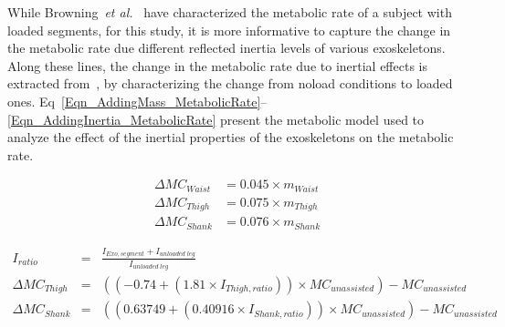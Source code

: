 \documentclass[10pt,letterpaper]{article}
\newcommand{\etal}{\textit{et al.}}
\begin{document}




While Browning~\etal~\cite{Browning2007} have characterized the metabolic rate of a subject with loaded segments, for this study, it is more informative to capture the change in the metabolic rate due different reflected inertia levels of various exoskeletons. Along these lines, the change in the metabolic rate due to inertial effects is extracted from~\cite{Browning2007}, by characterizing the change from noload conditions to loaded ones.  Eq~\eqref{Eqn_AddingMass_MetabolicRate}--\eqref{Eqn_AddingInertia_MetabolicRate} present the metabolic model used to analyze the effect of the inertial properties of the exoskeletons on the metabolic rate.

\begin{equation}\label{Eqn_AddingMass_MetabolicRate}
\begin{aligned}
\Delta MC_{Waist} &= 0.045\times m_{Waist}\\
\Delta MC_{Thigh} &= 0.075\times m_{Thigh}\\
\Delta MC_{Shank} &= 0.076\times m_{Shank}
\end{aligned}
\end{equation}

\small
\begin{eqnarray}\label{Eqn_AddingInertia_MetabolicRate}
I_{ratio} &=& \frac{I_{Exo,segment} + I_{un\textit{loaded}\;leg}}{I_{un\textit{loaded}\;leg}} \nonumber\\
\Delta MC_{Thigh} &=& ((-0.74 + (1.81\times I_{Thigh,ratio}))\times MC_{unassisted})-MC_{unassisted}\\
\Delta MC_{Shank} &=& ((0.63749 + (0.40916\times I_{Shank,ratio}))\times MC_{unassisted})-MC_{unassisted}\nonumber
\end{eqnarray} \normalsize
\end{document}
